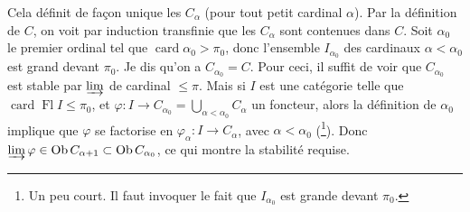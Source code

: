 Cela définit de façon unique les $C_\alpha$ (pour tout petit cardinal $\alpha$). Par la définition de $C$, on voit par induction transfinie que les $C_\alpha$ sont contenues dans $C$. Soit $\alpha_0$
le premier ordinal tel que $\operatorname{card}\alpha_0>\pi_0$, donc l'ensemble $I_{\alpha_0}$ des cardinaux $\alpha<\alpha_0$ est grand devant $\pi_0$. Je dis qu'on a $C_{\alpha_0}=C$. Pour ceci, il suffit de voir que $C_{\alpha_0}$ est stable par $\varinjlim$ de cardinal $\leqslant\pi$. Mais si $I$ est une catégorie telle que $\operatorname{card}\operatorname{Fl}I\leqslant\pi_0$, et $\varphi : I\longrightarrow C_{\alpha_0}=\bigcup_{\alpha<\alpha_0}C_\alpha$ un foncteur, alors la définition de $\alpha_0$ implique que $\varphi$ se factorise en $\varphi_\alpha : I\longrightarrow C_\alpha$, avec $\alpha<\alpha_0$ (\footnote[55]{Un peu court. Il faut invoquer le fait que $I_{\alpha_0}$ est grande devant $\pi_0$.}). Donc $\varinjlim\varphi\in\operatorname{Ob}C_{\alpha+1}\subset\operatorname{Ob}C_{\alpha_0}$, ce qui montre la stabilité requise. %

